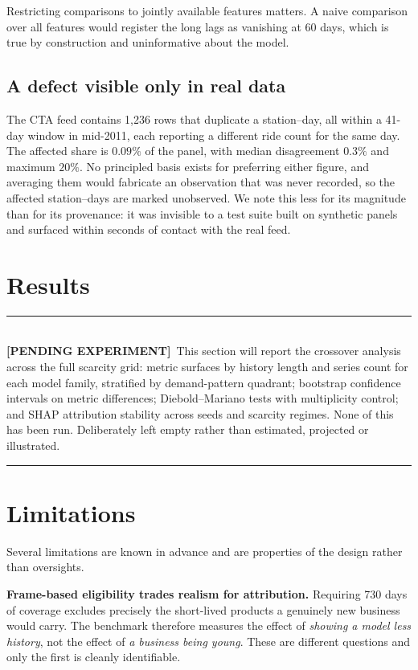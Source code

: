 \documentclass[11pt]{article}
\newcommand{\gap}[1]{%
  \par\vspace{0.6em}\noindent
  \colorbox{gapbg}{%
    \parbox{\dimexpr\linewidth-2\fboxsep}{%
      \color{gaprule}\rule{\linewidth}{0.8pt}\\[0.2em]
      \textcolor{gaprule}{\textbf{[PENDING EXPERIMENT]}}\ \color{black}#1\\[0.3em]
      \color{gaprule}\rule{\linewidth}{0.8pt}}}%
  \par\vspace{0.6em}}
\begin{document}
Restricting comparisons to jointly available features matters. A naive comparison
over all features would register the long lags as vanishing at 60 days, which is
true by construction and uninformative about the model.

\subsection{A defect visible only in real data}

The CTA feed contains 1{,}236 rows that duplicate a station--day, all within a
41-day window in mid-2011, each reporting a different ride count for the same
day. The affected share is $0.09\%$ of the panel, with median disagreement
$0.3\%$ and maximum $20\%$. No principled basis exists for preferring either
figure, and averaging them would fabricate an observation that was never
recorded, so the affected station--days are marked unobserved. We note this less
for its magnitude than for its provenance: it was invisible to a test suite
built on synthetic panels and surfaced within seconds of contact with the real
feed.

\section{Results}

\gap{This section will report the crossover analysis across the full scarcity
grid: metric surfaces by history length and series count for each model family,
stratified by demand-pattern quadrant; bootstrap confidence intervals on metric
differences; Diebold--Mariano tests with multiplicity control; and SHAP
attribution stability across seeds and scarcity regimes. None of this has been
run. Deliberately left empty rather than estimated, projected or illustrated.}

\section{Limitations}

Several limitations are known in advance and are properties of the design rather
than oversights.

\textbf{Frame-based eligibility trades realism for attribution.} Requiring 730
days of coverage excludes precisely the short-lived products a genuinely new
business would carry. The benchmark therefore measures the effect of \emph{showing
a model less history}, not the effect of \emph{a business being young}. These are
different questions and only the first is cleanly identifiable.
\end{document}
